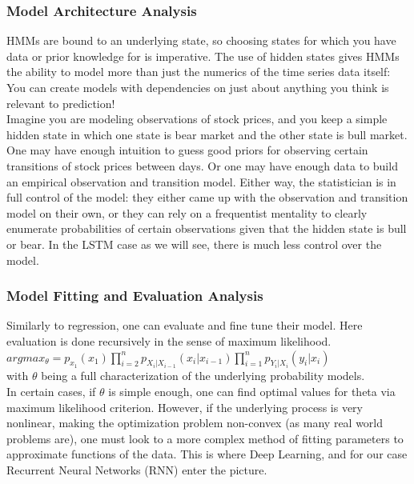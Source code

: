 \documentclass{article}
\begin{document}
\subsubsection{Model Architecture Analysis}
HMMs are bound to an underlying state, so choosing states for which you have data or prior knowledge for is imperative. The use of hidden states gives HMMs the ability to model more than just the numerics of the time series data itself: You can create models with dependencies on just about anything you think is relevant to prediction!\\ 
Imagine you are modeling observations of stock prices, and you keep a simple hidden state in which one state is bear market and the other state is bull market. One may have enough intuition to guess good priors for observing certain transitions of stock prices between days. Or one may have enough data to build an empirical observation and transition model. Either way, the statistician is in full control of the model: they either came up with the observation and transition model on their own, or they can rely on a frequentist mentality to clearly enumerate probabilities of certain observations given that the hidden state is bull or bear. In the LSTM case as we will see, there is much less control over the model.

\subsubsection{Model Fitting and Evaluation Analysis}
Similarly to regression, one can evaluate and fine tune their model. Here evaluation is done recursively in the sense of maximum likelihood. \\

$argmax_\theta = p_{x_1}(x_1)\prod_{i=2}^{n}p_{X_i|X_{i-1}}(x_i|x_{i-1})\prod_{i=1}^{n}p_{Y_i|X_{i}}(y_i|x_{i})$ \\
\indent with $\theta$ being a full characterization of the underlying probability models. \\

\noindent In certain cases, if $\theta$ is simple enough, one can find optimal values for theta via maximum likelihood criterion. However, if the underlying process is very nonlinear, making the optimization problem non-convex (as many real world problems are), one must look to a more complex method of fitting parameters to approximate functions of the data. This is where Deep Learning, and for our case Recurrent Neural Networks (RNN) enter the picture.
\end{document}
